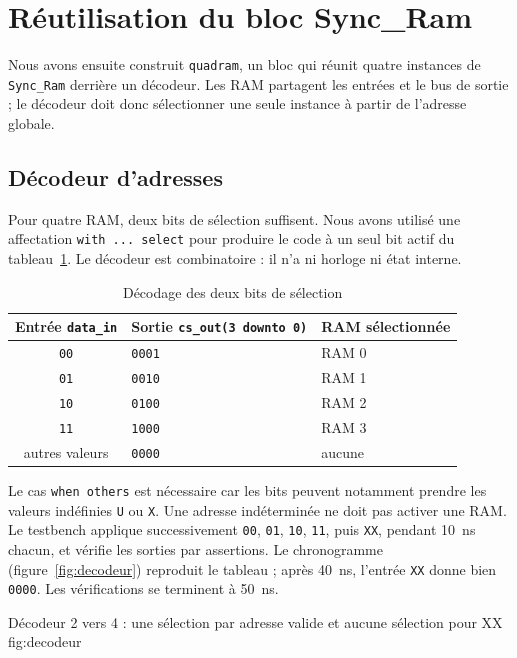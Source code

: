 \section{Réutilisation du bloc Sync\_Ram}
\label{sec:quadram}

Nous avons ensuite construit \texttt{quadram}, un bloc qui réunit quatre instances de
\texttt{Sync\_Ram} derrière un décodeur. Les RAM partagent les entrées et le bus de sortie ;
le décodeur doit donc sélectionner une seule instance à partir de l'adresse globale.

\subsection{Décodeur d'adresses}

Pour quatre RAM, deux bits de sélection suffisent. Nous avons utilisé une affectation
\texttt{with ... select} pour produire le code à un seul bit actif du
tableau~\ref{tab:decodeur}. Le décodeur est combinatoire : il n'a ni horloge ni état interne.

\begin{table}[H]
\centering
\begin{tabular}{cll}
\toprule
Entrée \texttt{data\_in} & Sortie \texttt{cs\_out(3 downto 0)} & RAM sélectionnée \\
\midrule
\texttt{00} & \texttt{0001} & RAM 0 \\
\texttt{01} & \texttt{0010} & RAM 1 \\
\texttt{10} & \texttt{0100} & RAM 2 \\
\texttt{11} & \texttt{1000} & RAM 3 \\
autres valeurs & \texttt{0000} & aucune \\
\bottomrule
\end{tabular}
\caption{Décodage des deux bits de sélection}
\label{tab:decodeur}
\end{table}

Le cas \texttt{when others} est nécessaire car les bits peuvent notamment prendre les
valeurs indéfinies \texttt{U} ou \texttt{X}. Une adresse indéterminée ne doit pas activer
une RAM. Le testbench applique successivement \texttt{00}, \texttt{01}, \texttt{10},
\texttt{11}, puis \texttt{XX}, pendant 10~ns chacun, et vérifie les sorties par assertions.
Le chronogramme (figure~\ref{fig:decodeur}) reproduit le tableau ; après 40~ns, l'entrée
\texttt{XX} donne bien \texttt{0000}. Les vérifications se terminent à 50~ns.

{Décodeur 2 vers 4 : une sélection par adresse valide et aucune sélection pour XX}
{fig:decodeur}

